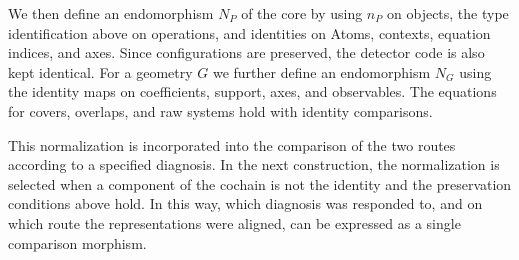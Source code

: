 \begin{definition}
We then define an endomorphism $N_P$ of the core by using $n_P$ on objects, the type
identification above on operations, and identities on Atoms, contexts, equation indices,
and axes. Since configurations are preserved, the detector code is also kept identical.
For a geometry $G$ we further define an endomorphism $N_G$ using the identity maps on
coefficients, support, axes, and observables. The equations for covers, overlaps, and raw
systems hold with identity comparisons.

This normalization is incorporated into the comparison of the two routes according to a
specified diagnosis. In the next construction, the normalization is selected when a
component of the cochain is not the identity and the preservation conditions above hold.
In this way, which diagnosis was responded to, and on which route the representations were
aligned, can be expressed as a single comparison morphism.

\end{definition}

